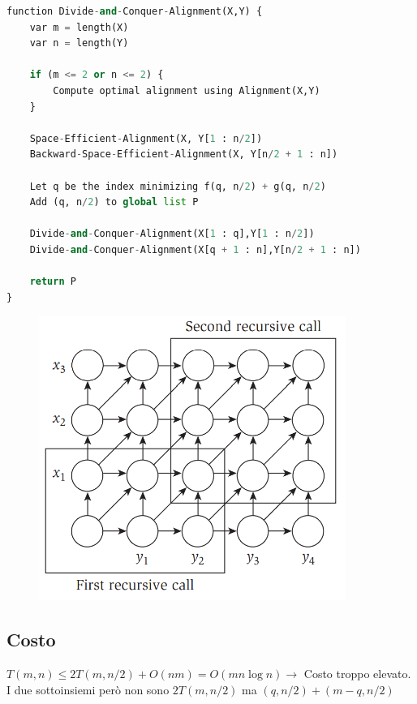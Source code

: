 \begin{lstlisting}[language=Python, mathescape=true]
function Divide-and-Conquer-Alignment(X,Y) {
    var m = length(X)
    var n = length(Y)

    if (m <= 2 or n <= 2) {
        Compute optimal alignment using Alignment(X,Y)
    }
    
    Space-Efficient-Alignment(X, Y[1 : n/2])
    Backward-Space-Efficient-Alignment(X, Y[n/2 + 1 : n])

    Let q be the index minimizing f(q, n/2) + g(q, n/2)
    Add (q, n/2) to global list P

    Divide-and-Conquer-Alignment(X[1 : q],Y[1 : n/2])
    Divide-and-Conquer-Alignment(X[q + 1 : n],Y[n/2 + 1 : n])
    
    return P
}
\end{lstlisting}

\begin{figure}[H]
	\centering
	\includegraphics[width=10cm, keepaspectratio]{capitoli/programmazione_dinamica/imgs/seq_align_recurrence.png}
\end{figure}

\subsection{Costo}

$T(m,n) \le 2T(m, n/2) + O(nm) = O(mn \log n) \rightarrow$ Costo
troppo elevato.\\ I due sottoinsiemi però non sono $2T(m, n/2)$ ma
$(q, n/2) + (m-q, n/2)$

